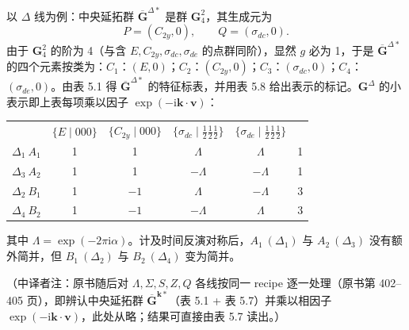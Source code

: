 以 $\Delta$ 线为例：中央延拓群 $\overline{\mathbf{G}}^{\Delta*}$ 是群 $\mathbf{G}^{2}_{4}$，其生成元为
\begin{equation*}
P = (C_{2y}, 0), \qquad Q = (\sigma_{dc}, 0).
\end{equation*}
由于 $\mathbf{G}^{2}_{4}$ 的阶为 4（与含 $E, C_{2y}, \sigma_{dc}, \sigma_{de}$ 的点群同阶），显然 $g$ 必为 1，于是 $\overline{\mathbf{G}}^{\Delta*}$ 的四个元素按类为：$C_{1}$：$(E, 0)$；$C_{2}$：$(C_{2y}, 0)$；$C_{3}$：$(\sigma_{dc}, 0)$；$C_{4}$：$(\sigma_{de}, 0)$。由表 5.1 得 $\overline{\mathbf{G}}^{\Delta*}$ 的特征标表，并用表 5.8 给出表示的标记。$\mathbf{G}^{\Delta}$ 的小表示即上表每项乘以因子 $\exp(-\mathrm{i}\mathbf{k} \cdot \mathbf{v})$：
\begin{center}
\begin{tabular}{lccccc}
 & $\{E \mid 000\}$ & $\{C_{2y} \mid 000\}$ & $\{\sigma_{dc} \mid {\frac{1}{2}}{\frac{1}{2}}{\frac{1}{2}}\}$ & $\{\sigma_{de} \mid {\frac{1}{2}}{\frac{1}{2}}{\frac{1}{2}}\}$ & \\
$\Delta_{1}\ A_{1}$ & 1 & 1 & $\Lambda$ & $\Lambda$ & 1\\
$\Delta_{3}\ A_{2}$ & 1 & 1 & $-\Lambda$ & $-\Lambda$ & 1\\
$\Delta_{2}\ B_{1}$ & 1 & $-1$ & $\Lambda$ & $-\Lambda$ & 3\\
$\Delta_{4}\ B_{2}$ & 1 & $-1$ & $-\Lambda$ & $\Lambda$ & 3
\end{tabular}
\end{center}
其中 $\Lambda = \exp(-2\pi\mathrm{i}\alpha)$。计及时间反演对称后，$A_{1}\ (\Delta_{1})$ 与 $A_{2}\ (\Delta_{3})$ 没有额外简并，但 $B_{1}\ (\Delta_{2})$ 与 $B_{2}\ (\Delta_{4})$ 变为简并。

\noindent（中译者注：原书随后对 $\Lambda, \Sigma, S, Z, Q$ 各线按同一 recipe 逐一处理（原书第 402--405 页），即辨认中央延拓群 $\overline{\mathbf{G}}^{\mathbf{k}*}$（表 5.1 + 表 5.7）并乘以相因子 $\exp(-\mathrm{i}\mathbf{k} \cdot \mathbf{v})$，此处从略；结果可直接由表 5.7 读出。）

